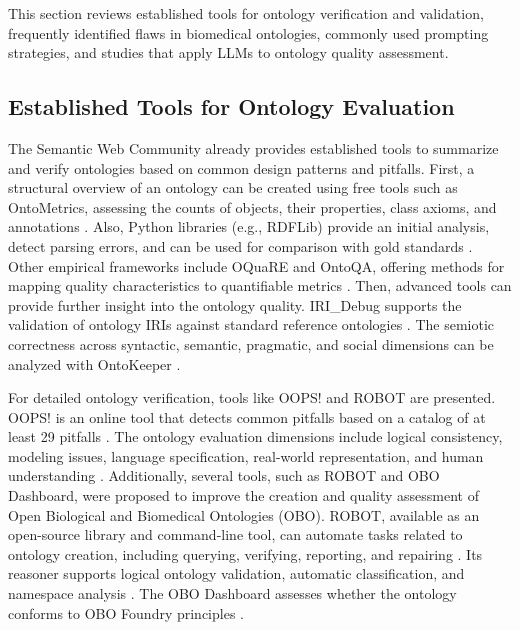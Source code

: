 \documentclass[
]{ceurart}
\begin{document}
This section reviews established tools for ontology verification and validation, frequently identified flaws in biomedical ontologies, commonly used prompting strategies, and studies that apply LLMs to ontology quality assessment.

\subsection{Established Tools for Ontology Evaluation}

The Semantic Web Community already provides established tools to summarize and verify ontologies based on common design patterns and pitfalls. First, a structural overview of an ontology can be created using free tools such as OntoMetrics, assessing the counts of objects, their properties, class axioms, and annotations \cite{Sammi2025, Wilson2022}. Also, Python libraries (e.g., RDFLib) provide an initial analysis, detect parsing errors, and can be used for comparison with gold standards \cite{li2025large}. Other empirical frameworks include OQuaRE and OntoQA, offering methods for mapping quality characteristics to quantifiable metrics \cite{Sammi2025}. Then, advanced tools can provide further insight into the ontology quality. IRI\_Debug supports the validation of ontology IRIs against standard reference ontologies \cite{Sammi2025}. The semiotic correctness across syntactic, semantic, pragmatic, and social dimensions can be analyzed with OntoKeeper \cite{Sammi2025}.

For detailed ontology verification, tools like OOPS! and ROBOT are presented. OOPS! is an online tool that detects common pitfalls based on a catalog of at least 29 pitfalls \cite{Sammi2025, PovedaVillaln2012OOPS, li2025large, Wilson2022,ElSappagh2019_FASTO}. The ontology evaluation dimensions include logical consistency, modeling issues, language specification, real-world representation, and human understanding \cite{PovedaVillaln2012OOPS}. Additionally, several tools, such as ROBOT and OBO Dashboard, were proposed to improve the creation and quality assessment of Open Biological and Biomedical Ontologies (OBO). ROBOT, available as an open-source library and command-line tool, can automate tasks related to ontology creation, including querying, verifying, reporting, and repairing \cite{Jackson2019ROBOT}. Its reasoner supports logical ontology validation, automatic classification, and namespace analysis \cite{Jackson2019ROBOT, Sowiski2022}. The OBO Dashboard assesses whether the ontology conforms to OBO Foundry principles \cite{Sowiski2022}.
\end{document}
